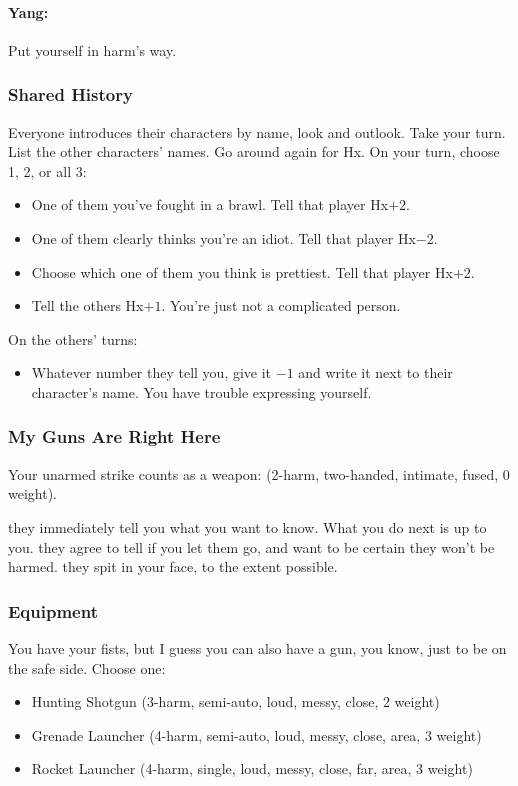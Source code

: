 \paragraph{Yang:} Put yourself in harm's way.

\subsubsection{Shared History}
Everyone introduces their characters by name, look and outlook. Take
your turn.  List the other characters' names.  Go around again for
Hx. On your turn, choose 1, 2, or all 3:
\begin{itemize} %
\item One of them you've fought in a brawl. Tell that player Hx$+2$.
\item One of them clearly thinks you're an idiot. Tell that player Hx$-2$.
\item Choose which one of them you think is prettiest. Tell that player Hx$+2$.
\item Tell the others Hx$+1$. You're just not a complicated person.
\end{itemize}
On the others’ turns:
\begin{itemize} %
\item Whatever number they tell you, give it $-1$ and write it next to
  their character’s name. You have trouble expressing yourself.
\end{itemize}

\subsubsection{My Guns Are Right Here}
Your unarmed strike counts as a weapon: (2-harm, two-handed, intimate, fused, 0 weight).


{they immediately tell you what you want to know. What you do next is up to you.}
{they agree to tell if you let them go, and want to be certain they won't be harmed.}
{they spit in your face, to the extent possible.}


\subsubsection{Equipment}
You have your fists, but I guess you can also have a gun, you know, just to be on the safe side. Choose one:
\begin{itemize}
\item Hunting Shotgun (3-harm, semi-auto, loud, messy, close, 2 weight)
\item Grenade Launcher (4-harm, semi-auto, loud, messy, close, area, 3 weight)
\item Rocket Launcher (4-harm, single, loud, messy, close, far, area, 3 weight)
\end{itemize}

